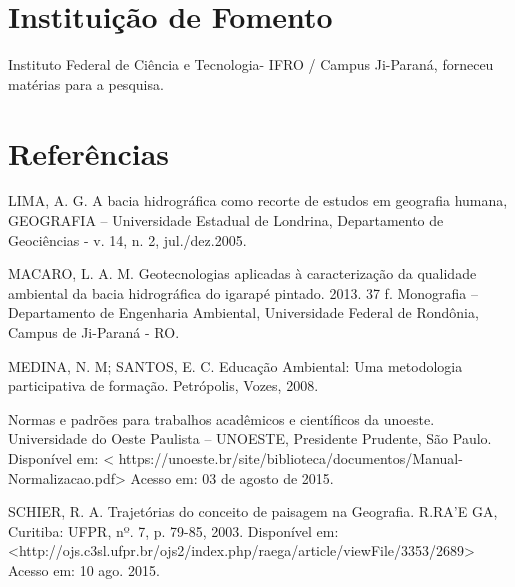 \documentclass[article,12pt,onesidea,4paper,english,brazil]{abntex2}
\begin{document}
	\section*{Instituição de Fomento}
	
	Instituto Federal de Ciência e Tecnologia- IFRO / Campus Ji-Paraná, forneceu matérias para a pesquisa.
	
	\sloppy
	
	\section*{Referências}
	
	\noindent LIMA, A. G. A bacia hidrográfica como recorte de estudos em geografia humana, GEOGRAFIA – Universidade Estadual de Londrina, Departamento de Geociências - v. 14,  n. 2, jul./dez.2005.
	
	
	\noindent MACARO, L. A. M. Geotecnologias aplicadas à caracterização da qualidade ambiental da bacia hidrográfica do igarapé pintado. 2013. 37 f. Monografia – Departamento de Engenharia Ambiental, Universidade Federal de Rondônia, Campus de Ji-Paraná - RO.
	
	
	\noindent MEDINA, N. M; SANTOS, E. C. Educação Ambiental: Uma metodologia participativa de formação. Petrópolis, Vozes, 2008.
	
	
	\noindent Normas e padrões para trabalhos acadêmicos e científicos da unoeste. Universidade do Oeste Paulista – UNOESTE, Presidente Prudente, São Paulo. Disponível em: < https://unoeste.br/site/biblioteca/documentos/Manual-Normalizacao.pdf> Acesso em: 03 de agosto de 2015.
	
	
	\noindent SCHIER, R. A. Trajetórias do conceito de paisagem na Geografia. R.RA’E GA, Curitiba: UFPR,	nº.	7,	p.	79-85,	2003.	Disponível	em:
	<http://ojs.c3sl.ufpr.br/ojs2/index.php/raega/article/viewFile/3353/2689> Acesso em: 10 ago. 2015.
	
	
\end{document}
